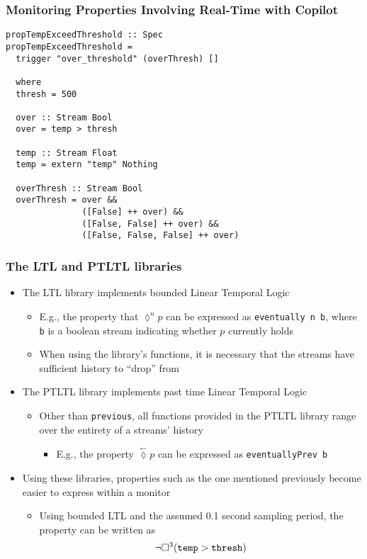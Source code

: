 \documentclass{beamer}
\begin{document}
\begin{frame}[fragile]
\frametitle{Monitoring Properties Involving Real-Time with Copilot}
\begin{lstlisting}
propTempExceedThreshold :: Spec
propTempExceedThreshold =
  trigger "over_threshold" (overThresh) []

  where
  thresh = 500

  over :: Stream Bool
  over = temp > thresh

  temp :: Stream Float
  temp = extern "temp" Nothing

  overThresh :: Stream Bool
  overThresh = over &&
               ([False] ++ over) &&
               ([False, False] ++ over) &&
               ([False, False, False] ++ over)

\end{lstlisting}
\end{frame}

\begin{frame}[fragile]
\frametitle{The LTL and PTLTL libraries}
\begin{itemize}
\item The LTL library implements bounded Linear Temporal Logic
  \begin{itemize}
  \item E.g., the property that $\lozenge^n p$ can be
  expressed as \verb,eventually n b,, where \verb,b, is a boolean
  stream indicating whether $p$ currently holds
  \item When using the library's functions, it is necessary that the streams
  have sufficient history to ``drop'' from
  \end{itemize}
\item The PTLTL library implements past time Linear Temporal Logic
  \begin{itemize}
  \item Other than \verb,previous,, all functions provided in the PTLTL
  library range over the entirety of a streams' history
    \begin{itemize}
    \item E.g., the property $\overset{\leftarrow}{\lozenge}p$ can be expressed as
    \verb,eventuallyPrev b,
    \end{itemize}
  \end{itemize}
\item Using these libraries, properties such as the one mentioned previously
become easier to express within a monitor
  \begin{itemize}
  \item Using bounded LTL and the assumed 0.1 second sampling period, the property can be
  written as
  $$\neg\square^{3}({\tt temp} > {\tt thresh})$$
  \end{itemize}
\end{itemize}
\end{frame}
\end{document}
